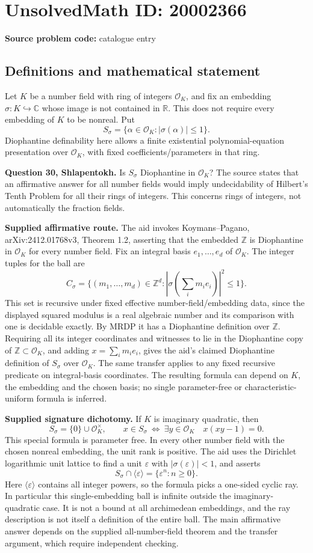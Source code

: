 \documentclass[11pt]{article}
\newcommand{\Z}{\mathbb{Z}}
\newcommand{\R}{\mathbb{R}}
\newcommand{\C}{\mathbb{C}}
\newcommand{\eps}{\varepsilon}
\begin{document}
\section*{UnsolvedMath ID: 20002366}
\textbf{Source problem code:} catalogue entry
\subsection{Definitions and mathematical statement}
Let $K$ be a number field with ring of integers $\mathcal O_K$, and fix an embedding $\sigma:K\hookrightarrow\C$ whose image is not contained in $\R$. This does not require every embedding of $K$ to be nonreal. Put
\[
 S_\sigma=\{\alpha\in\mathcal O_K:|\sigma(\alpha)|\le1\}.
\]
Diophantine definability here allows a finite existential polynomial-equation presentation over $\mathcal O_K$, with fixed coefficients/parameters in that ring.

\textbf{Question 30, Shlapentokh.} Is $S_\sigma$ Diophantine in $\mathcal O_K$? The source states that an affirmative answer for all number fields would imply undecidability of Hilbert's Tenth Problem for all their rings of integers. This concerns rings of integers, not automatically the fraction fields.

\textbf{Supplied affirmative route.} The aid invokes Koymans--Pagano, arXiv:2412.01768v3, Theorem 1.2, asserting that the embedded $\Z$ is Diophantine in $\mathcal O_K$ for every number field. Fix an integral basis $e_1,\ldots,e_d$ of $\mathcal O_K$. The integer tuples for the ball are
\[
 C_\sigma=\{(m_1,\ldots,m_d)\in\Z^d:
             |\sigma(\sum_i m_ie_i)|^2\le1\}.
\]
This set is recursive under fixed effective number-field/embedding data, since the displayed squared modulus is a real algebraic number and its comparison with one is decidable exactly. By MRDP it has a Diophantine definition over $\Z$. Requiring all its integer coordinates and witnesses to lie in the Diophantine copy of $\Z\subset\mathcal O_K$, and adding $x=\sum_i m_ie_i$, gives the aid's claimed Diophantine definition of $S_\sigma$ over $\mathcal O_K$. The same transfer applies to any fixed recursive predicate on integral-basis coordinates. The resulting formula can depend on $K$, the embedding and the chosen basis; no single parameter-free or characteristic-uniform formula is inferred.

\textbf{Supplied signature dichotomy.} If $K$ is imaginary quadratic, then
\[
 S_\sigma=\{0\}\cup\mathcal O_K^\times,
 \qquad x\in S_\sigma\ \Longleftrightarrow\
                \exists y\in\mathcal O_K\quad x(xy-1)=0.
\]
This special formula is parameter free. In every other number field with the chosen nonreal embedding, the unit rank is positive. The aid uses the Dirichlet logarithmic unit lattice to find a unit $\eps$ with $|\sigma(\eps)|<1$, and asserts
\[
 S_\sigma\cap\langle\eps\rangle=\{\eps^n:n\ge0\}.
\]
Here $\langle\eps\rangle$ contains all integer powers, so the formula picks a one-sided cyclic ray. In particular this single-embedding ball is infinite outside the imaginary-quadratic case. It is not a bound at all archimedean embeddings, and the ray description is not itself a definition of the entire ball. The main affirmative answer depends on the supplied all-number-field theorem and the transfer argument, which require independent checking.
\end{document}
